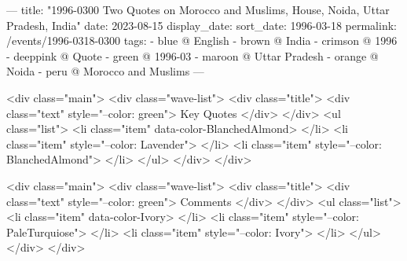 ---
title: "1996-0300 Two Quotes on Morocco and Muslims, House, Noida, Uttar Pradesh, India"
date: 2023-08-15
display_date: 
sort_date: 1996-03-18
permalink: /events/1996-0318-0300
tags:
  - blue @ English
  - brown @ India
  - crimson @ 1996
  - deeppink @ Quote
  - green @ 1996-03
  - maroon @ Uttar Pradesh
  - orange @ Noida
  - peru @ Morocco and Muslims
---

<div class="main">
  <div class="wave-list">
    <div class="title">
      <div class="text" style="--color: green">
        Key Quotes
      </div>
    </div>
    <ul class="list">
        <li class="item" data-color-BlanchedAlmond>
        </li>
        <li class="item" style="--color: Lavender">
        </li>
        <li class="item" style="--color: BlanchedAlmond">
        </li>
      </ul>
  </div>
</div>

<div class="main">
  <div class="wave-list">
    <div class="title">
      <div class="text" style="--color: green">
        Comments
      </div>
    </div>
    <ul class="list">
        <li class="item" data-color-Ivory>
        </li>
        <li class="item" style="--color: PaleTurquiose">
        </li>
        <li class="item" style="--color: Ivory">
        </li>
      </ul>
  </div>
</div>